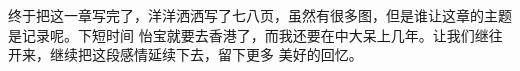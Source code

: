 \documentclass[cn,11pt,chinese]{elegantbook}
\begin{document}
{终于把这一章写完了，洋洋洒洒写了七八页，虽然有很多图，但是谁让这章的主题是记录呢。下短时间
怡宝就要去香港了，而我还要在中大呆上几年。让我们继往开来，继续把这段感情延续下去，留下更多
美好的回忆。}
%
%
%
%
%
%
%
\end{document}
